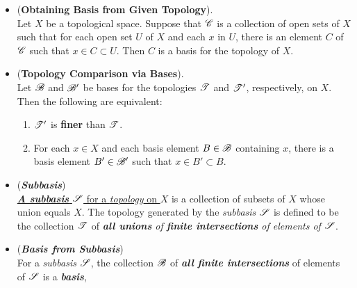 \documentclass[11pt]{article}
\begin{document}
\begin{itemize}
\item \begin{lemma} (\textbf{Obtaining Basis from Given Topology}). \citep{munkres2000topology}\\
Let $X$ be a topological space. Suppose that ${\mathscr C}$ is a collection of open sets of $X$ such that for each open set $U$ of $X$ and each $x$ in $U$, there is an element $C$ of ${\mathscr C}$ such that $x \in C \subset U$. Then $C$ is a basis for the topology of $X$.
\end{lemma}

\item \begin{lemma} (\textbf{Topology Comparison via Bases}). \citep{munkres2000topology}\\
Let ${\mathscr B}$ and ${\mathscr B}'$ be bases for the topologies ${\mathscr T}$ and ${\mathscr T}'$, respectively, on $X$. Then the following are equivalent:
\begin{enumerate}
\item  ${\mathscr T}'$ is \textbf{finer} than ${\mathscr T}$.
\item For each $x \in X$ and each basis element $B \in {\mathscr B}$ containing $x$, there is a basis element $B' \in {\mathscr B}'$ such that $x \in B' \subset B$.
\end{enumerate}
\end{lemma}

\item \begin{definition}(\emph{\textbf{Subbasis}})\\
\underline{\emph{\textbf{A subbasis}} ${\mathscr S}$ for a \emph{topology} on $X$} is a collection of subsets of $X$ whose union equals $X$. The topology generated by the \emph{subbasis} ${\mathscr S}$ is defined to be the  collection ${\mathscr T}$ of \emph{\textbf{all unions} of \textbf{finite intersections} of elements of ${\mathscr S}$}.
\end{definition}

\item \begin{remark}(\textbf{\emph{Basis from Subbasis}})\\
For a \emph{subbasis} ${\mathscr S}$, the collection ${\mathscr B}$ of \emph{\textbf{all finite intersections}} of elements of ${\mathscr S}$ is a \emph{\textbf{basis}},
\end{remark}
\end{itemize}
\end{document}
